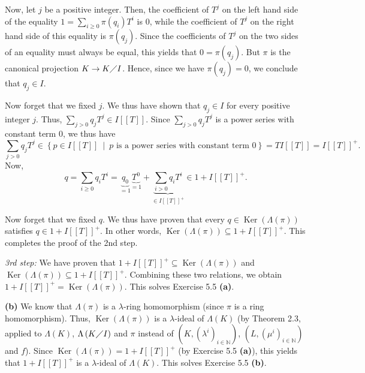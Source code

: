 \documentclass[numbers=enddot,12pt,final,onecolumn,notitlepage]{scrartcl}%
\begin{document}
Now, let $j$ be a positive integer. Then, the coefficient of $T^{j}$ on the
left hand side of the equality $1=\sum\limits_{i\geq0}\pi\left(  q_{i}\right)
T^{i}$ is $0$, while the coefficient of $T^{j}$ on the right hand side of this
equality is $\pi\left(  q_{j}\right)  $. Since the coefficients of $T^{j}$ on
the two sides of an equality must always be equal, this yields that
$0=\pi\left(  q_{j}\right)  $. But $\pi$ is the canonical projection
$K\rightarrow K\diagup I$. Hence, since we have $\pi\left(  q_{j}\right)  =0$,
we conclude that $q_{j}\in I$.

Now forget that we fixed $j$. We thus have shown that $q_{j}\in I$ for every
positive integer $j$. Thus, $\sum\limits_{j>0}q_{j}T^{j}\in I\left[  \left[
T\right]  \right]  $. Since $\sum\limits_{j>0}q_{j}T^{j}$ is a power series
with constant term $0$, we thus have%
\[
\sum\limits_{j>0}q_{j}T^{j}\in\left\{  p\in I\left[  \left[  T\right]
\right]  \ \mid\ p\text{ is a power series with constant term }0\right\}
=TI\left[  \left[  T\right]  \right]  =I\left[  \left[  T\right]  \right]
^{+}.
\]
Now,%
\[
q=\sum\limits_{i\geq0}q_{i}T^{i}=\underbrace{q_{0}}_{=1}\underbrace{T^{0}%
}_{=1}+\underbrace{\sum\limits_{i>0}q_{i}T^{i}}_{\in I\left[  \left[
T\right]  \right]  ^{+}}\in1+I\left[  \left[  T\right]  \right]  ^{+}.
\]


Now forget that we fixed $q$. We thus have proven that every $q\in
\operatorname*{Ker}\left(  \Lambda\left(  \pi\right)  \right)  $ satisfies
$q\in1+I\left[  \left[  T\right]  \right]  ^{+}$. In other words,
$\operatorname*{Ker}\left(  \Lambda\left(  \pi\right)  \right)  \subseteq
1+I\left[  \left[  T\right]  \right]  ^{+}$. This completes the proof of the
2nd step.

\textit{3rd step:} We have proven that $1+I\left[  \left[  T\right]  \right]
^{+}\subseteq\operatorname*{Ker}\left(  \Lambda\left(  \pi\right)  \right)  $
and $\operatorname*{Ker}\left(  \Lambda\left(  \pi\right)  \right)
\subseteq1+I\left[  \left[  T\right]  \right]  ^{+}$. Combining these two
relations, we obtain $1+I\left[  \left[  T\right]  \right]  ^{+}%
=\operatorname*{Ker}\left(  \Lambda\left(  \pi\right)  \right)  $. This solves
Exercise 5.5 \textbf{(a)}.

\textbf{(b)} We know that $\Lambda\left(  \pi\right)  $ is a $\lambda$-ring
homomorphism (since $\pi$ is a ring homomorphism). Thus, $\operatorname*{Ker}%
\left(  \Lambda\left(  \pi\right)  \right)  $ is a $\lambda$-ideal of
$\Lambda\left(  K\right)  $ (by Theorem 2.3, applied to $\Lambda\left(
K\right)  $, $\Lambda\left(  K\diagup I\right)  $ and $\pi$ instead of
$\left(  K,\left(  \lambda^{i}\right)  _{i\in\mathbb{N}}\right)  $, $\left(
L,\left(  \mu^{i}\right)  _{i\in\mathbb{N}}\right)  $ and $f$). Since
$\operatorname*{Ker}\left(  \Lambda\left(  \pi\right)  \right)  =1+I\left[
\left[  T\right]  \right]  ^{+}$ (by Exercise 5.5 \textbf{(a)}), this yields
that $1+I\left[  \left[  T\right]  \right]  ^{+}$ is a $\lambda$-ideal of
$\Lambda\left(  K\right)  $. This solves Exercise 5.5 \textbf{(b)}.
\end{document}
